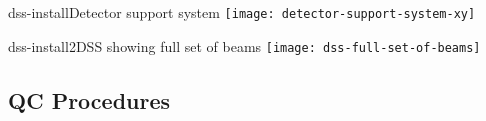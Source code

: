 \begin{cdrfigure}{dss-install}{Detector support system}
\texttt{[image: detector-support-system-xy]}
\end{cdrfigure}

\begin{cdrfigure}{dss-install2}{DSS showing full set of beams}
 \texttt{[image: dss-full-set-of-beams]}
\end{cdrfigure}

\subsection{QC Procedures}

